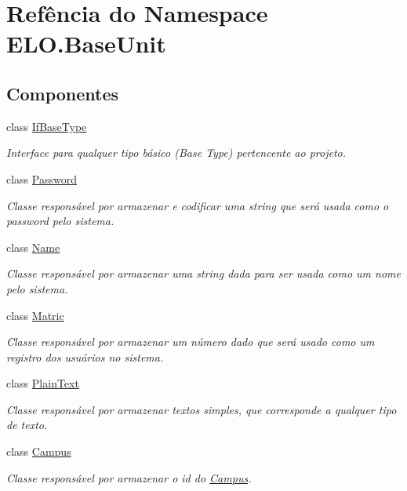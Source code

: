\hypertarget{namespaceELO_1_1BaseUnit}{\section{Refência do Namespace E\-L\-O.\-Base\-Unit}
\label{namespaceELO_1_1BaseUnit}
}
\subsection*{Componentes}
\begin{DoxyCompactItemize}
\item 
class \hyperlink{classELO_1_1BaseUnit_1_1IfBaseType}{If\-Base\-Type}
\begin{DoxyCompactList}\small\item\em Interface para qualquer tipo básico (Base Type) pertencente ao projeto. \end{DoxyCompactList}\item 
class \hyperlink{classELO_1_1BaseUnit_1_1Password}{Password}
\begin{DoxyCompactList}\small\item\em Classe responsável por armazenar e codificar uma string que será usada como o password pelo sistema. \end{DoxyCompactList}\item 
class \hyperlink{classELO_1_1BaseUnit_1_1Name}{Name}
\begin{DoxyCompactList}\small\item\em Classe responsável por armazenar uma string dada para ser usada como um nome pelo sistema. \end{DoxyCompactList}\item 
class \hyperlink{classELO_1_1BaseUnit_1_1Matric}{Matric}
\begin{DoxyCompactList}\small\item\em Classe responsável por armazenar um número dado que será usado como um registro dos usuários no sistema. \end{DoxyCompactList}\item 
class \hyperlink{classELO_1_1BaseUnit_1_1PlainText}{Plain\-Text}
\begin{DoxyCompactList}\small\item\em Classe responsável por armazenar textos simples, que corresponde a qualquer tipo de texto. \end{DoxyCompactList}\item 
class \hyperlink{classELO_1_1BaseUnit_1_1Campus}{Campus}
\begin{DoxyCompactList}\small\item\em Classe responsável por armazenar o id do \hyperlink{classELO_1_1BaseUnit_1_1Campus}{Campus}. \end{DoxyCompactList}\item 

\end{DoxyCompactItemize}
